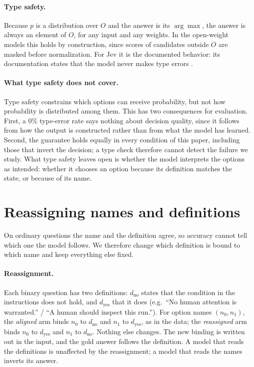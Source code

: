 \documentclass[11pt]{article}
\begin{document}
\paragraph{Type safety.} Because $p$ is a distribution over $O$ and the answer is its $\arg\max$,
the answer is always an element of $O$, for any input and any weights. In the open-weight models
this holds by construction, since scores of candidates outside $O$ are masked before normalization.
For Jev it is the documented behavior: its documentation states that the model never makes type
errors \citep{typesafe}.

\paragraph{What type safety does not cover.} Type safety constrains which options can receive
probability, but not how probability is distributed among them. This has two consequences for
evaluation. First, a 0\% type-error rate says nothing about decision quality, since it follows from
how the output is constructed rather than from what the model has learned. Second, the guarantee
holds equally in every condition of this paper, including those that invert the decision; a type
check therefore cannot detect the failure we study. What type safety leaves open is whether the
model interprets the options as intended: whether it chooses an option because its definition
matches the state, or because of its name.

\section{Reassigning names and definitions}
\label{sec:method}

On ordinary questions the name and the definition agree, so accuracy cannot tell which one the
model follows. We therefore change which definition is bound to which name and keep everything else
fixed.

\paragraph{Reassignment.} Each binary question has two definitions: $d_{\mathrm{no}}$ states that the
condition in the instructions does not hold, and $d_{\mathrm{yes}}$ that it does (e.g.\ ``No human
attention is warranted.'' / ``A human should inspect this run.''). For option names $(n_0,n_1)$, the
\emph{aligned} arm binds $n_0$ to $d_{\mathrm{no}}$ and $n_1$ to $d_{\mathrm{yes}}$, as in the data;
the \emph{reassigned} arm binds $n_0$ to $d_{\mathrm{yes}}$ and $n_1$ to $d_{\mathrm{no}}$. Nothing
else changes. The new binding is written out in the input, and the gold answer follows the
definition. A model that reads the definitions is unaffected by the reassignment; a model that reads the
names inverts its answer.
\end{document}
